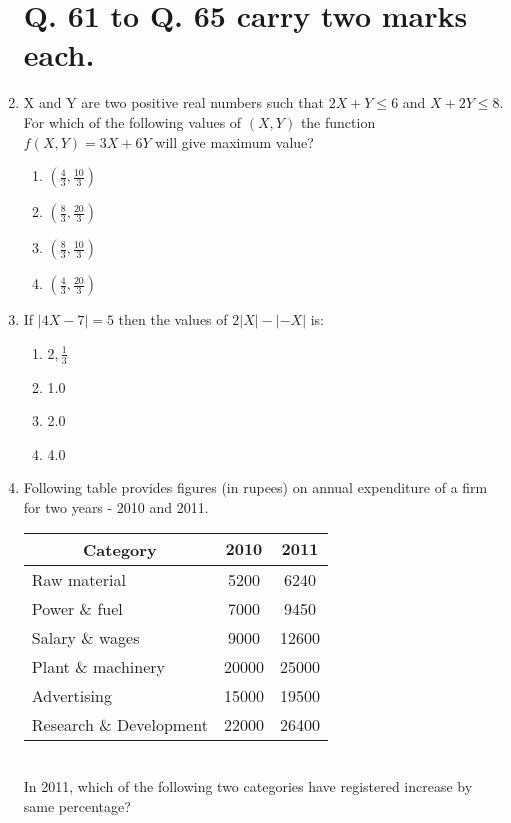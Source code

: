 \documentclass[journal]{IEEEtran}
\begin{document}
\begin{enumerate}
  \section*{Q. 61 to Q. 65 carry two marks each.}
\item   X and Y are two positive real numbers such that $2 X+Y \leq 6$ and $X+2 Y \leq 8$. For which of the following values of $(X, Y)$ the function $f(X, Y)=3 X+6 Y$ will give maximum value?
\begin{multicols}{4}
			\begin{enumerate}

\item  $(\frac{4}  {3},\frac{10} { 3})$
\item $(\frac{8} {3},\frac{20} {3})$
\item $(\frac{8} {3},\frac{10}{ 3})$
\item $(\frac{4} { 3},\frac{20} { 3})$
   \end{enumerate}
		\end{multicols}
  \item  If $|4 X-7|=5$ then the values of $2|X|-|-X|$ is:
  \begin{multicols}{4}
			\begin{enumerate}
   \item $2,\frac{1} {3}$
\item 1.0
\item  2.0
\item 4.0
 \end{enumerate}
		\end{multicols}
  \item Following table provides figures (in rupees) on annual expenditure of a firm for two years - 2010 and 2011.\\
  \begin{tabular}{|l|c|c|}
\hline \multicolumn{1}{|c|}{ Category } & $\mathbf{2 0 1 0}$ & $\mathbf{2 0 1 1}$ \\
\hline Raw material & 5200 & 6240 \\
\hline Power \& fuel & 7000 & 9450 \\
\hline Salary \& wages & 9000 & 12600 \\
\hline Plant \& machinery & 20000 & 25000 \\
\hline Advertising & 15000 & 19500 \\
\hline Research \& Development & 22000 & 26400 \\
\hline
\end{tabular}
\\In 2011, which of the following two categories have registered increase by same percentage?
 

\end{enumerate}
\end{document}
